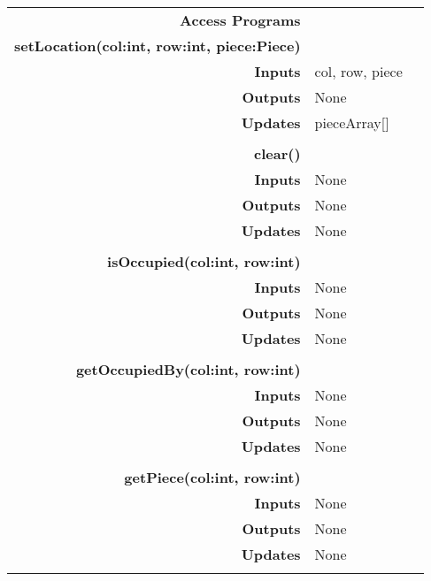 \documentclass[10pt]{article}
\begin{document}
\begin{tabularx}{\linewidth}{ >{\bfseries}r Xp{5cm} }
            Access Programs & \begin{tabular}[t]{@{} l l p{8cm}} 
                                     & \\
                                    \bf{setLocation(col:int, row:int, piece:Piece)} & \\
                                    Inputs &  col, row, piece\\
                                    Outputs & None \\
                                    Updates & pieceArray[] \\ 
                                     & \\
                                    \bf{clear()} & \\
                                    Inputs & None \\
                                    Outputs & None \\
                                    Updates & None \\
                                     & \\
                                    \bf{isOccupied(col:int, row:int)} & \\
                                    Inputs & None \\
                                    Outputs & None \\
                                    Updates & None \\ 
                                     & \\
                                    \bf{getOccupiedBy(col:int, row:int)} & \\
                                    Inputs & None \\
                                    Outputs & None \\
                                    Updates & None \\
                                     & \\
                                    \bf{getPiece(col:int, row:int)} & \\
                                    Inputs & None \\
                                    Outputs & None \\
                                    Updates & None \\                                     
                              \end{tabular} \\
                              
        \end{tabularx}
        
\end{document}
